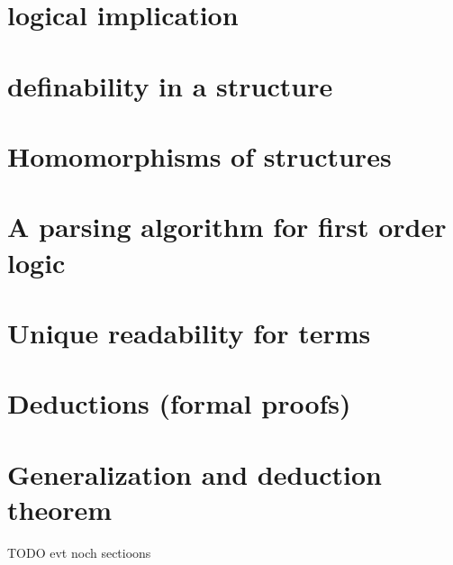 \section{logical implication}
\section{definability in a structure}
\section{Homomorphisms of structures}
\section{A parsing algorithm for first order logic}
\section{Unique readability for terms}
\section{Deductions (formal proofs)}
\section{Generalization and deduction theorem}
TODO evt noch sectioons
